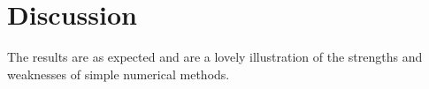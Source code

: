 \documentclass[11pt,a4paper]{article}
\begin{document}
\section{Discussion}
The results are as expected and are a lovely illustration of the strengths and weaknesses of simple numerical methods.












\end{document}
